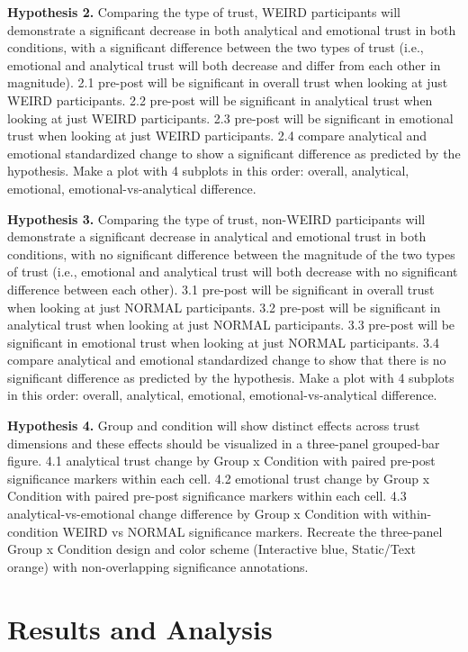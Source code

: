 \documentclass[a4paper,fleqn]{cas-sc}
\begin{document}
\textbf{Hypothesis 2.} Comparing the type of trust, WEIRD participants will demonstrate a significant decrease in both analytical and emotional trust in both conditions, with a significant difference between the two types of trust (i.e., emotional and analytical trust will both decrease and differ from each other in magnitude).
2.1 pre-post will be significant in overall trust when looking at just WEIRD participants.
2.2 pre-post will be significant in analytical trust when looking at just WEIRD participants.
2.3 pre-post will be significant in emotional trust when looking at just WEIRD participants.
2.4 compare analytical and emotional standardized change to show a significant difference as predicted by the hypothesis.
Make a plot with 4 subplots in this order: overall, analytical, emotional, emotional-vs-analytical difference.

\textbf{Hypothesis 3.} Comparing the type of trust, non-WEIRD participants will demonstrate a significant decrease in analytical and emotional trust in both conditions, with no significant difference between the magnitude of the two types of trust (i.e., emotional and analytical trust will both decrease with no significant difference between each other).
3.1 pre-post will be significant in overall trust when looking at just NORMAL participants.
3.2 pre-post will be significant in analytical trust when looking at just NORMAL participants.
3.3 pre-post will be significant in emotional trust when looking at just NORMAL participants.
3.4 compare analytical and emotional standardized change to show that there is no significant difference as predicted by the hypothesis.
Make a plot with 4 subplots in this order: overall, analytical, emotional, emotional-vs-analytical difference.

\textbf{Hypothesis 4.} Group and condition will show distinct effects across trust dimensions and these effects should be visualized in a three-panel grouped-bar figure.
4.1 analytical trust change by Group x Condition with paired pre-post significance markers within each cell.
4.2 emotional trust change by Group x Condition with paired pre-post significance markers within each cell.
4.3 analytical-vs-emotional change difference by Group x Condition with within-condition WEIRD vs NORMAL significance markers.
Recreate the three-panel Group x Condition design and color scheme (Interactive blue, Static/Text orange) with non-overlapping significance annotations.

\section{Results and Analysis}
\end{document}
